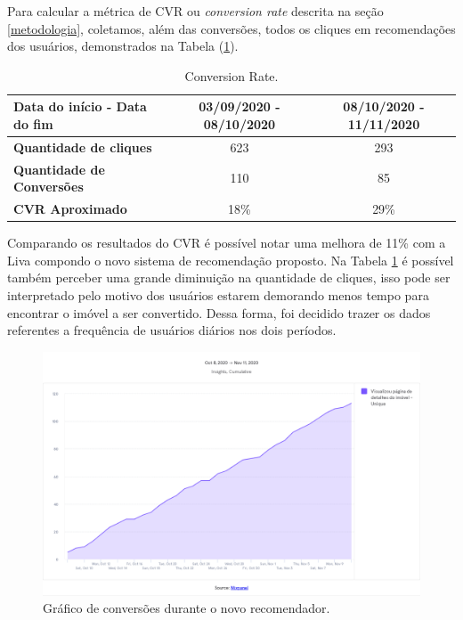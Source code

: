 Para calcular a métrica de CVR ou \textit{conversion rate} descrita na seção \ref{metodologia}, coletamos, além das conversões, todos os cliques em recomendações dos usuários, demonstrados na Tabela (\ref{tab:my-table3}).

\begin{table}[H]
\centering
\caption[\textit{conversion rate}]{Conversion Rate.}
\begin{tabular}{lcc}
\hline
\textbf{Data do início - Data do fim} & 03/09/2020 - 08/10/2020 & 08/10/2020 - 11/11/2020 \\ \hline
\textbf{Quantidade de cliques} & 623 & 293 \\ \hline
\textbf{Quantidade de Conversões} & 110 & 85 \\ \hline
\textbf{CVR Aproximado} & 18\% & 29\% \\ \hline
\end{tabular}
\label{tab:my-table3}
\end{table}

Comparando os resultados do CVR é possível notar uma melhora de 11\% com a Liva compondo o novo sistema de recomendação proposto. Na Tabela \ref{tab:my-table3} é possível também perceber uma grande diminuição na quantidade de cliques, isso pode ser interpretado pelo motivo dos usuários estarem demorando menos tempo para encontrar o imóvel a ser convertido. Dessa forma, foi decidido trazer os dados referentes a frequência de usuários diários nos dois períodos.

\begin{figure}[H]
    \centering
    \includegraphics[scale=0.38]{figuras/desenvolvimento/mixpanel-antes.png}
    \caption[Gráfico de conversões durante o novo recomendador]{Gráfico de conversões durante o novo recomendador.}
    \label{fig:mixpanel-antes}
\end{figure}

